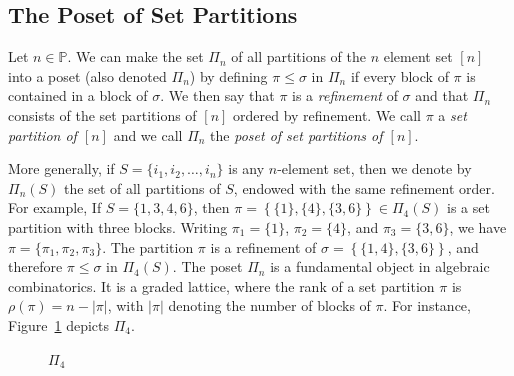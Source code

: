 \documentclass[a4paper,11pt]{amsart}
\theoremstyle{definition}
\numberwithin{equation}{section}
\def\Pos{\mathbb{P}}
\def\rkf{\rho}
\begin{document}
\subsection{The Poset of Set Partitions}\label{ssc:SetPar}
%
Let $n \in \Pos$. 
We can make the set $\Pi_{n}$ of all partitions of the $n$ element set $[n]$ into a poset 
(also denoted $\Pi_{n}$) by defining $\pi\leq\sigma$ in $\Pi_{n}$ 
if every block of $\pi$ is contained in a block of $\sigma$. 
We then say that $\pi$ is a \textsl{refinement} of $\sigma$ and that $\Pi_{n}$ consists of the set partitions of $[n]$ ordered
by refinement.
We call $\pi$ a \textsl{set partition of $[n]$}
and we call $\Pi_{n}$ the \textsl{poset of set partitions of $[n]$}.
%
\par
%
More generally, if $S=\{i_{1},i_{2},\dots,i_{n}\}$ is any $n$-element set,
then we denote by $\Pi_{n}(S)$ the set of all partitions of $S$,
endowed with the same refinement order.
%
For example, If $S=\{1,3,4,6\}$, then $\pi=\left\{\{1\},\{4\},\{3,6\}\right\}\in\Pi_{4}(S)$ is a set partition with three blocks.
Writing $\pi_{1}=\{1\}$, $\pi_{2}=\{4\}$, and $\pi_{3}=\{3,6\}$,
we have $\pi=\{\pi_{1},\pi_{2},\pi_{3}\}$.
The partition $\pi$ is a refinement of $\sigma=\left\{\{1,4\},\{3,6\}\right\}$,
and therefore $\pi\leq\sigma$ in $\Pi_{4}(S)$.
The poset $\Pi_{n}$ is a fundamental object in algebraic combinatorics.
It is a graded lattice, where the rank of a set partition 
$\pi$ is $\rkf(\pi)=n-|\pi|$,
with $|\pi|$ denoting the number of blocks of $\pi$.
For instance, Figure~\ref{fig:Pi4} depicts $\Pi_{4}$.
%
\begin{figure}[hbt]
   \caption{$\Pi_{4}$\label{fig:Pi4}}
\end{figure}
%
\end{document}
